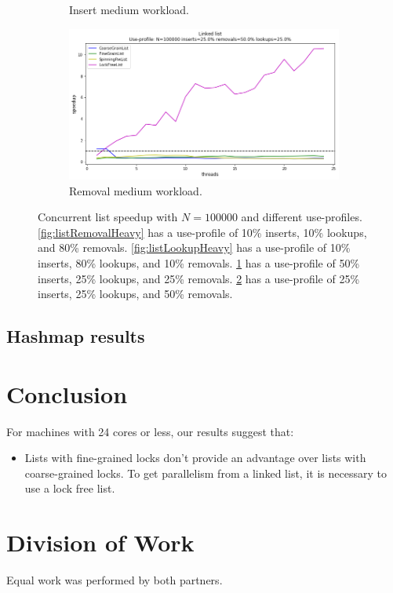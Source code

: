 \documentclass[11pt]{article}
\begin{document}
\begin{figure}[h]
\begin{subfigure}{.6\textwidth}
  \caption{Insert medium workload.}
  \label{fig:listInsertMedium}
\end{subfigure}%
\begin{subfigure}{.6\textwidth}
  \centering
  \includegraphics[width=.8\linewidth]{figs/lateday/combined/lateday_combined_list_insert_25_lookup_25_removal_50}
  \caption{Removal medium workload.}
  \label{fig:listRemovalMedium}
\end{subfigure}
\caption{
Concurrent list speedup with $N=100000$ and different use-profiles.
\ref{fig:listRemovalHeavy} has a use-profile of 10\% inserts, 10\% lookups, and
80\% removals. \ref{fig:listLookupHeavy} has a use-profile of 10\% inserts, 80\%
lookups, and 10\% removals. \ref{fig:listInsertMedium} has a use-profile of 50\%
inserts, 25\% lookups, and 25\% removals. \ref{fig:listRemovalMedium} has a
use-profile of 25\% inserts, 25\% lookups, and 50\% removals.
}
\label{fig:manyLists}
\end{figure}

\subsection{Hashmap results}

\section{Conclusion}
For machines with 24 cores or less, our results suggest that:
\begin{itemize}
\item
Lists with fine-grained locks don't provide an advantage over lists with
coarse-grained locks. To get parallelism from a linked list, it is necessary to
use a lock free list.
\end{itemize}

\section{Division of Work}
Equal work was performed by both partners.

\printbibliography
\end{document}
